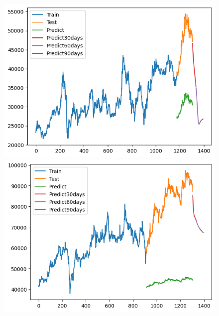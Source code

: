 \begin{figure}[H]
\begin{minipage}{0.15\textwidth}
    \centering 
    \includegraphics[width=1\textwidth]{resources/chapter-5/newdata1/result/BIDV_LSTM_9-1.png}
    \end{minipage}
    \hfill
    \begin{minipage}{0.15\textwidth}
    \centering
    \includegraphics[width=1\textwidth]{resources/chapter-5/newdata1/result/VCB_ LSTM_7-3.png}
    \end{minipage}
    \hfill
    \begin{minipage}{0.15\textwidth}
    \centering

\end{minipage}
\end{figure}
